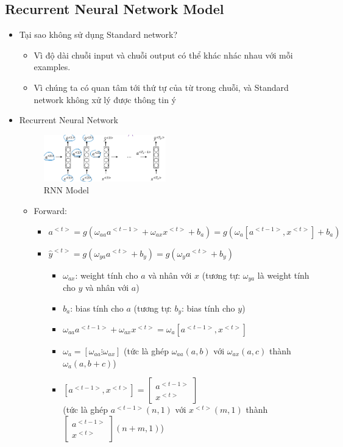 \documentclass[12pt,a4paper]{report}
\begin{document}
		\subsection{Recurrent Neural Network Model}
			\begin{itemize}
				\item Tại sao không sử dụng Standard network?
					\begin{itemize}
						\item Vì độ dài chuỗi input và chuỗi output có thể khác nhác nhau với mỗi examples.
						\item Vì chúng ta có quan tâm tới thứ tự của từ trong chuỗi, và Standard network không xử lý được thông tin ý
					\end{itemize}					 
				\item Recurrent Neural Network
					\begin{figure}[h]
						\caption{RNN Model}
						\centering
					\includegraphics[width=0.5\textwidth]{1}
					\end{figure}
					\begin{itemize}
						\item Forward:
							\begin{itemize}
								\item $a^{<t>} = g(\omega_{aa} a^{<t-1>} + \omega_{ax} x^{<t>} + b_a) = g(\omega_a[a^{<t-1>}, x^{<t>}] + b_a)$
								\item $\hat{y}^{<t>} = g(\omega_{ya} a^{<t>} + b_y) = g(\omega_{y} a^{<t>} + b_y)$
									\begin{itemize}
										\item $\omega_{ax}$: weight tính cho $a$ và nhân với $x$ (tương tự: $\omega_{ya}$ là weight tính cho $y$ và nhân với $a$)
										\item $b_a$: bias tính cho $a$ (tương tự: $b_y$: bias tính cho $y$)
										\item $\omega_{aa} a^{<t-1>} + \omega_{ax} x^{<t>} = \omega_a[a^{<t-1>}, x^{<t>}]$
										\item $\omega_a = [\omega_{aa} \vdots \omega_{ax}]$ (tức là ghép $\omega_{aa} (a, b)$ với $\omega_{ax} (a, c)$ thành $\omega_a (a, b + c)$)
										\item $[a^{<t-1>}, x^{<t>}] = \begin{bmatrix}
										a^{<t-1>}\\
										x^{<t>}
										\end{bmatrix}$\\ (tức là ghép $a^{<t-1>} (n, 1)$ với $x^{<t>} (m, 1)$ thành $\begin{bmatrix}
										a^{<t-1>}\\
										x^{<t>}
										\end{bmatrix} (n + m, 1)$)
									\end{itemize}
							\end{itemize}
					\end{itemize}
			\end{itemize}
\end{document}
